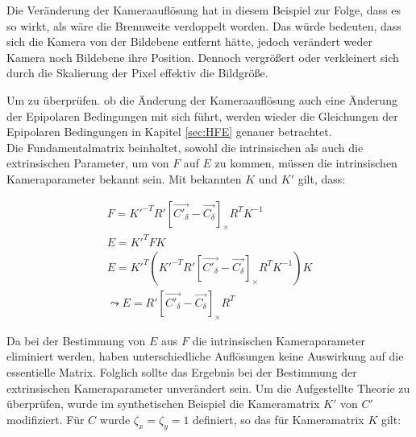 Die Veränderung der Kameraauflösung hat in diesem Beispiel zur Folge, dass es so wirkt, als wäre die Brennweite verdoppelt worden. Das würde bedeuten, dass sich die Kamera von der Bildebene entfernt hätte, jedoch verändert weder Kamera noch Bildebene ihre Position. Dennoch vergrößert oder verkleinert sich durch die Skalierung der Pixel effektiv die Bildgröße. 

Um zu überprüfen. ob die Änderung der Kameraauflösung auch eine Änderung der Epipolaren Bedingungen mit sich führt, werden wieder die Gleichungen der Epipolaren Bedingungen in Kapitel \ref{sec:HFE} genauer betrachtet.\\

Die Fundamentalmatrix beinhaltet, sowohl die intrinsischen als auch die extrinsischen Parameter, um von $F$ auf $E$ zu kommen, müssen die intrinsischen Kameraparameter bekannt sein. Mit bekannten $K$ und $K'$ gilt, dass:

\begin{gather}
	F = K'^{-T}R' \left[ \vec{C'_\delta}-\vec{C_\delta}\right]_\times R^TK^{-1}\\
	E = K'^{T}FK\\
	E= K'^T (K'^{-T}R' \left[ \vec{C'_\delta}-\vec{C_\delta}\right]_\times R^TK^{-1}) K\\
	\leadsto E = R' \left[ \vec{C'_\delta}-\vec{C_\delta}\right]_\times R^T		
\end{gather}

Da bei der Bestimmung von $E$ aus $F$ die intrinsischen Kameraparameter eliminiert werden, haben unterschiedliche Auflösungen keine Auswirkung auf die essentielle Matrix. Folglich sollte das Ergebnis bei der Bestimmung der extrinsischen Kameraparameter unverändert sein. Um die Aufgestellte Theorie zu überprüfen, wurde im synthetischen Beispiel die Kameramatrix $K'$ von $C'$ modifiziert. Für $C$ wurde $\zeta_x = \zeta_y = 1$ definiert, so das für Kameramatrix $K$ gilt:  




